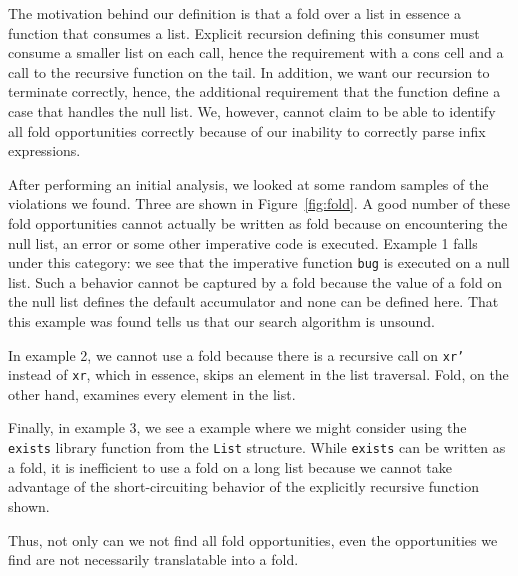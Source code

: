 \documentclass[12pt,abstracton]{scrartcl}
\begin{document}
The motivation behind our definition is that a fold over a list in essence
a function that consumes a list. Explicit recursion defining this consumer must
consume a smaller list on each call, hence the requirement with a cons cell and a
call to the recursive function on the tail. In addition, we want our recursion to terminate
correctly, hence, the additional requirement that the function define a case that handles
the null list.
We, however, cannot claim to be able to identify all
fold opportunities correctly because of our inability
to correctly parse infix expressions.

After performing an initial analysis, we looked at some
random samples of the violations we found.
Three are shown in Figure~\ref{fig:fold}.
A good number of these fold opportunities cannot actually
be written as fold because on encountering the null list, an error or
some other imperative code is executed. Example 1 falls under this category:
we see that the imperative function \texttt{bug} is executed
on a null list.
Such a behavior cannot be captured by a fold because the value of a
fold on the null list defines the default accumulator and none
can be defined here.
That this example was found tells us that our search algorithm is unsound.

In example 2, we cannot use a fold because 
there is a recursive call on \texttt{xr'} instead of \texttt{xr},
which in essence, skips an element in the list traversal.
Fold, on the other hand, examines every element in the list.

Finally, in example 3, we see a example where we might consider
using the \texttt{exists} library function from the \texttt{List}
structure. While \texttt{exists} can be written as a fold,
it is inefficient to use a fold on a long list because
we cannot take advantage of the short-circuiting behavior
of the explicitly recursive function shown.

Thus, not only can we not find all fold opportunities,
even the opportunities we find are not necessarily
translatable into a fold.
\end{document}
